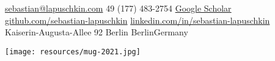 \documentclass[10pt,a4paper]{article} %
\begin{document}

\noindent
\begin{minipage}{.8\textwidth}


\noindent\href{mailto:sebastian@lapuschkin.com}{sebastian@lapuschkin.com}\bull %
\textsmaller{+}49 (177) 483-2754\bull %
\href{https://scholar.google.com/citations?user=wpLQuroAAAAJ}{Google Scholar}
\\
\href{https://github.com/sebastian-lapuschkin}{github.com/sebastian-lapuschkin}\bull %
\href{https://www.linkedin.com/in/sebastian-lapuschkin}{linkedin.com/in/sebastian-lapuschkin} %
\\
Kaiserin-Augusta-Allee 92 Berlin \bull Berlin\bull Germany %
\end{minipage}
\begin{minipage}{.2\textwidth}
\texttt{[image: resources/mug-2021.jpg]}
\end{minipage}


\spacedhrule{0.9em}{-0.4em} %


\spacedhrule{0.5em}{-0.4em} %
 



\spacedhrule{0.5em}{-0.4em} %
\end{document}

